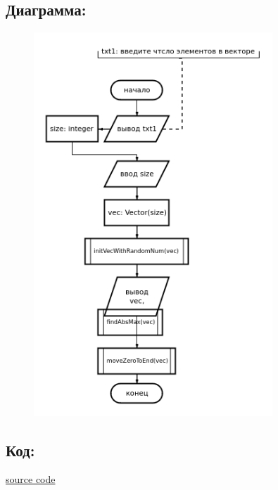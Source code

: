 \documentclass[14pt,a4paper]{article}
\begin{document}
\subsection{Диаграмма:}
\begin{figure}[H]
  \centering
  \includegraphics[width=0.8\textwidth]{data/diagram18_1.png}
\end{figure}
\subsection{Код:}

\href{https://raw.githubusercontent.com/John1400800/stuff/refs/heads/main/c_learning/home_works/task18_1.cpp}{source
code}
\end{document}
